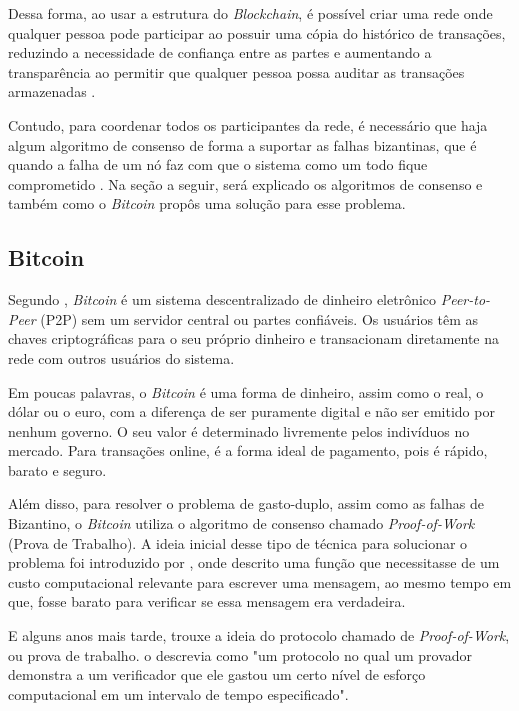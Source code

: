 Dessa forma, ao usar a estrutura do \textit{Blockchain}, é possível criar uma rede onde qualquer pessoa pode participar ao possuir uma cópia do histórico de transações, reduzindo a necessidade de confiança entre as partes e aumentando a transparência ao permitir que qualquer pessoa possa auditar as transações armazenadas \cite{blockchain}.

Contudo, para coordenar todos os participantes da rede, é necessário que haja algum algoritmo de consenso de forma a suportar as falhas bizantinas, que é quando a falha de um nó faz com que o sistema como um todo fique comprometido \cite{byzantine_fault_tolerance}. Na seção a seguir, será explicado os algoritmos de consenso e também como o \textit{Bitcoin} propôs uma solução para esse problema.

\subsection{Bitcoin}

Segundo \cite{bitcoin2}, \textit{Bitcoin} é um sistema descentralizado de dinheiro eletrônico \textit{Peer-to-Peer} (P2P) sem um servidor central ou partes confiáveis. Os usuários têm as chaves criptográficas para o seu próprio dinheiro e transacionam diretamente na rede com outros usuários do sistema.

Em poucas palavras, o \textit{Bitcoin} é uma forma de dinheiro, assim como o real, o dólar ou o euro, com a diferença de ser puramente digital e não ser emitido por nenhum governo. O seu valor é determinado livremente pelos indivíduos no mercado. Para transações online, é a forma ideal de pagamento, pois é rápido, barato e seguro.

Além disso, para resolver o problema de gasto-duplo, assim como as falhas de Bizantino, o \textit{Bitcoin} utiliza o algoritmo de consenso chamado \textit{Proof-of-Work} (Prova de Trabalho). A ideia inicial desse tipo de técnica para solucionar o problema foi introduzido por \cite{pricing_via_processing}, onde descrito uma função que necessitasse de um custo computacional relevante para escrever uma mensagem, ao mesmo tempo em que, fosse barato para verificar se essa mensagem era verdadeira.

E alguns anos mais tarde, \cite{proofs_of_work_original} trouxe a ideia do protocolo chamado de \textit{Proof-of-Work}, ou prova de trabalho. \citeauthor{proofs_of_work_original} o descrevia como "um protocolo no qual um provador demonstra a um verificador que ele gastou um certo nível de esforço computacional em um intervalo de tempo especificado". 

